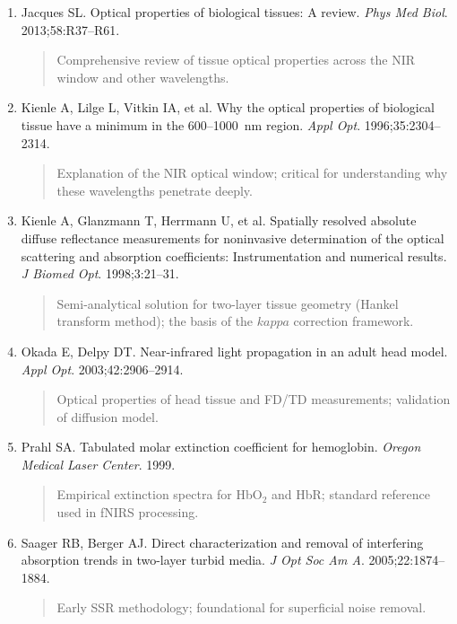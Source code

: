 \documentclass[12pt]{article}
\def\kappa{kappa}%
\begin{document}
\begin{enumerate}
\item Jacques SL. Optical properties of biological tissues: A review. \textit{Phys Med Biol}. 2013;58:R37--R61.
\begin{quote}
Comprehensive review of tissue optical properties across the NIR window and other wavelengths.
\end{quote}

\item Kienle A, Lilge L, Vitkin IA, et al. Why the optical properties of biological tissue have a minimum in the 600--1000~nm region. \textit{Appl Opt}. 1996;35:2304--2314.
\begin{quote}
Explanation of the NIR optical window; critical for understanding why these wavelengths penetrate deeply.
\end{quote}

\item Kienle A, Glanzmann T, Herrmann U, et al. Spatially resolved absolute diffuse reflectance measurements for noninvasive determination of the optical scattering and absorption coefficients: Instrumentation and numerical results. \textit{J Biomed Opt}. 1998;3:21--31.
\begin{quote}
Semi-analytical solution for two-layer tissue geometry (Hankel transform method); the basis of the $\kappa$ correction framework.
\end{quote}

\item Okada E, Delpy DT. Near-infrared light propagation in an adult head model. \textit{Appl Opt}. 2003;42:2906--2914.
\begin{quote}
Optical properties of head tissue and FD/TD measurements; validation of diffusion model.
\end{quote}

\item Prahl SA. Tabulated molar extinction coefficient for hemoglobin. \textit{Oregon Medical Laser Center}. 1999.
\begin{quote}
Empirical extinction spectra for HbO$_2$ and HbR; standard reference used in fNIRS processing.
\end{quote}

\item Saager RB, Berger AJ. Direct characterization and removal of interfering absorption trends in two-layer turbid media. \textit{J Opt Soc Am A}. 2005;22:1874--1884.
\begin{quote}
Early SSR methodology; foundational for superficial noise removal.
\end{quote}


\end{enumerate}
\end{document}
